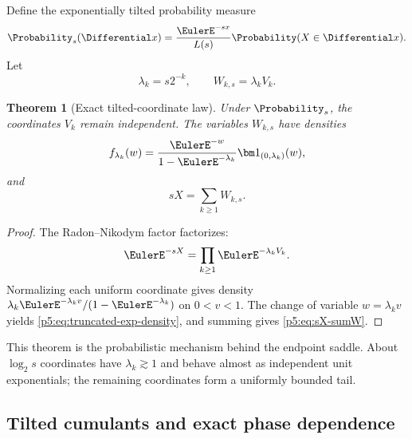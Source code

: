 \documentclass[11pt]{article}
\numberwithin{equation}{section}
\newtheorem{theorem}{Theorem}[section]
\theoremstyle{definition}
\theoremstyle{remark}
\begin{document}
Define the exponentially tilted probability measure
\begin{equation}\label{p5:eq:tilt-def}
 \Probability_s(\Differential x)=\frac{\EulerE^{-sx}}{L(s)}\Probability(X\in\Differential x).
\end{equation}
Let
\begin{equation}\label{p5:eq:lambda-W}
 \lambda_k=s2^{-k},\qquad W_{k,s}=\lambda_kV_k.
\end{equation}

\begin{theorem}[Exact tilted-coordinate law]\label{p5:thm:tilted-coordinates}
Under $\Probability_s$, the coordinates $V_k$ remain independent.  The variables
$W_{k,s}$ have densities
\begin{equation}\label{p5:eq:truncated-exp-density}
 f_{\lambda_k}(w)=
 \frac{\EulerE^{-w}}{1-\EulerE^{-\lambda_k}}
 \bm1_{(0,\lambda_k)}(w),
\end{equation}
and
\begin{equation}\label{p5:eq:sX-sumW}
 sX=\sum_{k\ge1}W_{k,s}.
\end{equation}
\end{theorem}

\begin{proof}
The Radon--Nikodym factor factorizes:
\[
 \EulerE^{-sX}=\prod_{k\ge1}\EulerE^{-\lambda_kV_k}.
\]
Normalizing each uniform coordinate gives density
$\lambda_k\EulerE^{-\lambda_kv}/(1-\EulerE^{-\lambda_k})$ on $0<v<1$.
The change of variable $w=\lambda_kv$ yields
\cref{p5:eq:truncated-exp-density}, and summing gives \cref{p5:eq:sX-sumW}.
\end{proof}

This theorem is the probabilistic mechanism behind the endpoint saddle.  About
$\log_2s$ coordinates have $\lambda_k\gtrsim1$ and behave almost as independent
unit exponentials; the remaining coordinates form a uniformly bounded tail.

\subsection{Tilted cumulants and exact phase dependence}
\end{document}
